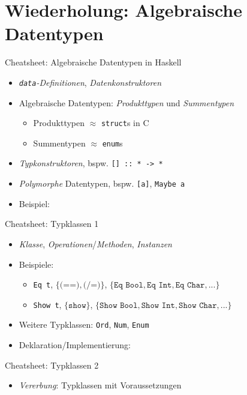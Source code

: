 \documentclass{beamer}
\begin{document}
\section{Wiederholung: Algebraische Datentypen}

\begin{frame}{Cheatsheet: Algebraische Datentypen in Haskell}
  \begin{itemize}
    \item \emph{\texttt{data}-Definitionen}, \emph{Datenkonstruktoren}
    \item Algebraische Datentypen: \emph{Produkttypen} und \emph{Summentypen}
    \begin{itemize}
      \item Produkttypen $\approx$ \texttt{struct}s in C
      \item Summentypen $\approx$ \texttt{enum}s
    \end{itemize}
    \item \emph{Typkonstruktoren}, bspw. \texttt{[] :: * -> *}
    \item \emph{Polymorphe} Datentypen, bspw. \texttt{[a]}, \texttt{Maybe a}
    \item Beispiel:
  \end{itemize}
\end{frame}

\begin{frame}{Cheatsheet: Typklassen 1}
  \begin{itemize}
    \item \emph{Klasse}, \emph{Operationen}/\emph{Methoden}, \emph{Instanzen}
    \item Beispiele:
    \begin{itemize}
      \item \texttt{Eq t}, $\{ \texttt{(==)}, \texttt{(/=)} \}$, $\{ \texttt{Eq Bool}, \texttt{Eq Int}, \texttt{Eq Char}, ... \}$
      \item \texttt{Show t}, $\{ \texttt{show} \}$, $\{ \texttt{Show Bool}, \texttt{Show Int}, \texttt{Show Char}, ... \}$
    \end{itemize}
    \item Weitere Typklassen: \texttt{Ord}, \texttt{Num}, \texttt{Enum}
    \item Deklaration/Implementierung:
  \end{itemize}

\end{frame}

\begin{frame}{Cheatsheet: Typklassen 2}
  \begin{itemize}
    \item \emph{Vererbung}: Typklassen mit Voraussetzungen
  \end{itemize}

\end{frame}
\end{document}
